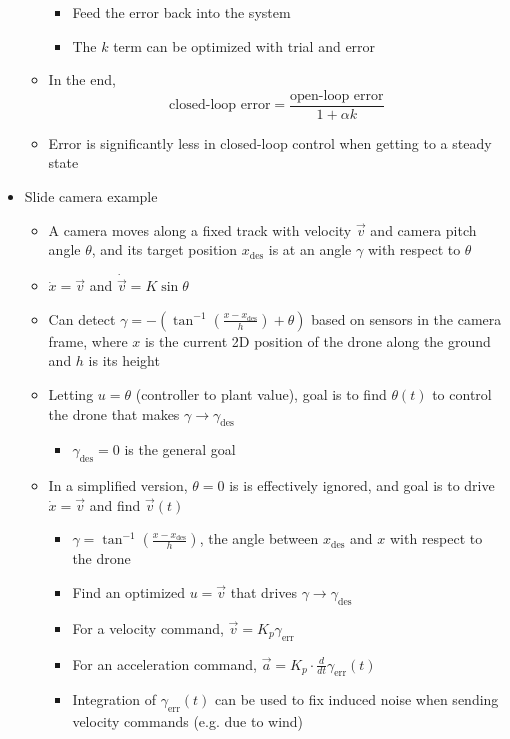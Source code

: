\documentclass{article}
\begin{document}
\begin{itemize}
\begin{itemize}
\begin{itemize}
\item Feed the error back into the system
\item The $k$ term can be optimized with trial and error
\end{itemize}
\item In the end,
\begin{equation*}
\text{closed-loop error}=\frac{\text{open-loop error}}{1+\alpha k}
\end{equation*}
\item Error is significantly less in closed-loop control when getting to a steady state
\end{itemize}
\item Slide camera example
\begin{itemize}
\item A camera moves along a fixed track with velocity $\vec{v}$ and camera pitch angle $\theta$, and its target position $x_\text{des}$ is at an angle $\gamma$ with respect to $\theta$
\item $\dot{x}=\vec{v} $ and $\dot{\vec{v}}=K\sin\theta$ 
\item Can detect $\gamma=-(\tan^{-1}(\frac{x-x_\text{des}}{h})+\theta)$ based on sensors in the camera frame, where $x$ is the current 2D position of the drone along the ground and $h$ is its height
\item Letting $u=\theta$ (controller to plant value), goal is to find $\theta(t)$ to control the drone that makes $\gamma\rightarrow\gamma_\text{des}$
\begin{itemize}
\item $\gamma_\text{des}=0$ is the general goal
\end{itemize}
\item In a simplified version, $\theta=0$ is is effectively ignored, and goal is to drive $\dot x=\vec{v}$ and find $\vec{v}(t)$
\begin{itemize}
\item  $\gamma=\tan^{-1}(\frac{x-x_\text{des}}{h})$, the angle between $x_\text{des}$ and $x$ with respect to the drone
\item Find an optimized $u=\vec{v}$  that drives $\gamma\rightarrow\gamma_\text{des}$ 
\item For a velocity command, $\vec{v}=K_p\gamma_\text{err}$
\item For an acceleration command, $\vec{a}=K_p\cdot\frac{d}{dt}\gamma_\text{err}(t)$
\item Integration of $\gamma_\text{err}(t)$ can be used to fix induced noise when sending velocity commands (e.g. due to wind)
\end{itemize}
\end{itemize}
\end{itemize}
\end{document}
